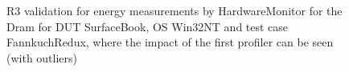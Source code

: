 \begin{figure}
                            \caption{R3 validation for energy measurements by HardwareMonitor for the Dram for DUT SurfaceBook, OS Win32NT and test case FannkuchRedux, where the impact of the first profiler can be seen (with outliers)} \label{fig:SurfaceBook_HardwareMonitor_Dram_R3_energy_with_outliers_Win32NT_avg_watts}
                            \end{figure}
                            